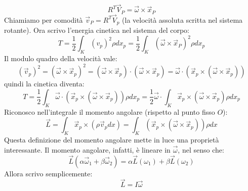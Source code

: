 \documentclass[a4paper,openany]{article}
\begin{document}
	\begin{equation}
		R^{T}\vec{V}_{P} = \vec{\omega}\times\vec{x}_{P}
		\label{TrasfVelo}
	\end{equation}
	Chiamiamo per comodità $\vec{v}_{P} = R^{T}\vec{V}_{p}$ (la velocità assoluta scritta nel sistema rotante). Ora scrivo l'energia cinetica nel sistema del corpo:
	$$
	T = \dfrac{1}{2}\int_{K}(v_{p})^{2}\rho dx_{p} = \dfrac{1}{2}\int_{K}(\vec{\omega}\times\vec{x}_{P})^{2}\rho dx_{p}
	$$
	Il modulo quadro della velocità vale:
	$$
	(\vec{v}_{p})^{2} = (\vec{\omega}\times\vec{x}_{p})^2 = (\vec{\omega}\times\vec{x}_{p})\cdot(\vec{\omega}\times\vec{x}_{p}) = \vec{\omega}\cdot(\vec{x}_{p}\times(\vec{\omega}\times\vec{x}_{p}))
	$$
	quindi la cinetica diventa:
	\begin{equation}
		T = \dfrac{1}{2}\int_{K}\vec{\omega}\cdot(\vec{x}_{p}\times(\vec{\omega}\times\vec{x}_{p}))\rho dx_{p} = \dfrac{1}{2}\vec{\omega}\cdot\int_{K}\vec{x}_{p}\times(\vec{\omega}\times\vec{x}_{p})\rho dx_{p}
	\end{equation}
	Riconosco nell'integrale il momento angolare (rispetto al punto fisso $O$):
	\begin{equation}
		\vec{L} = \int_{K} \vec{x}_{p}\times(\rho \vec{v}_{p}dx) =  \int_{K}(\vec{x}_{p}\times(\vec{\omega}\times\vec{x}_{p}))\rho dx
		\label{MomAng}
	\end{equation}
	Questa definizione del momento angolare mette in luce una proprietà interessante. Il momento angolare, infatti, è lineare in $\vec{\omega}$, nel senso che:
	$$
	\vec{L}(\alpha\vec{\omega}_{1} + \beta\vec{\omega}_{2}) = \alpha \vec{L}(\omega_1) + \beta \vec{L}(\omega_2)
	$$
	Allora scrivo semplicemente:
	\begin{equation}
		\vec{L} = I\vec{\omega}
		\label{TrasfLin}
	\end{equation}
\end{document}
